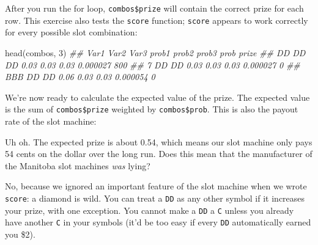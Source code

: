 \documentclass[
  letterpaper,
  DIV=11,
  numbers=noendperiod]{scrbook}
\newenvironment{Shaded}{\begin{snugshade}}{\end{snugshade}}
\newcommand{\ControlFlowTok}[1]{\textcolor[rgb]{0.00,0.23,0.31}{\textbf{#1}}}
\newcommand{\DecValTok}[1]{\textcolor[rgb]{0.68,0.00,0.00}{#1}}
\newcommand{\DocumentationTok}[1]{\textcolor[rgb]{0.37,0.37,0.37}{\textit{#1}}}
\newcommand{\FunctionTok}[1]{\textcolor[rgb]{0.28,0.35,0.67}{#1}}
\newcommand{\NormalTok}[1]{\textcolor[rgb]{0.00,0.23,0.31}{#1}}
\newcommand{\OtherTok}[1]{\textcolor[rgb]{0.00,0.23,0.31}{#1}}
\newcommand{\SpecialCharTok}[1]{\textcolor[rgb]{0.37,0.37,0.37}{#1}}
\begin{document}
\begin{Shaded}
\end{Shaded}

After you run the for loop, \texttt{combos\$prize} will contain the
correct prize for each row. This exercise also tests the \texttt{score}
function; \texttt{score} appears to work correctly for every possible
slot combination:

\begin{Shaded}
\begin{Highlighting}[]
\FunctionTok{head}\NormalTok{(combos, }\DecValTok{3}\NormalTok{)}
\DocumentationTok{\#\# Var1 Var2 Var3 prob1 prob2 prob3     prob prize}
\DocumentationTok{\#\#   DD   DD   DD  0.03  0.03  0.03 0.000027   800}
\DocumentationTok{\#\#    7   DD   DD  0.03  0.03  0.03 0.000027     0}
\DocumentationTok{\#\#  BBB   DD   DD  0.06  0.03  0.03 0.000054     0}
\end{Highlighting}
\end{Shaded}

We're now ready to calculate the expected value of the prize. The
expected value is the sum of \texttt{combos\$prize} weighted by
\texttt{combos\$prob}. This is also the payout rate of the slot machine:

\begin{Shaded}
\end{Shaded}

Uh oh. The expected prize is about 0.54, which means our slot machine
only pays 54 cents on the dollar over the long run. Does this mean that
the manufacturer of the Manitoba slot machines \emph{was} lying?

No, because we ignored an important feature of the slot machine when we
wrote \texttt{score}: a diamond is wild. You can treat a \texttt{DD} as
any other symbol if it increases your prize, with one exception. You
cannot make a \texttt{DD} a \texttt{C} unless you already have another
\texttt{C} in your symbols (it'd be too easy if every \texttt{DD}
automatically earned you \$2).
\end{document}
